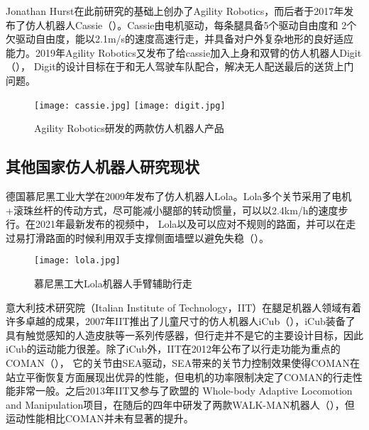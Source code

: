 Jonathan Hurst在此前研究的基础上创办了Agility Robotics，而后者于2017年发布了仿人机器人Cassie\cite{Cassie}（）。Cassie由电机驱动，每条腿具备5个驱动自由度和
2个欠驱动自由度，能以2.1m/s的速度高速行走，并具备对户外复杂地形的良好适应能力。2019年Agility Robotics又发布了给cassie加入上身和双臂的仿人机器人Digit\cite{Digit}（），
Digit的设计目标在于和无人驾驶车队配合，解决无人配送最后的送货上门问题。
\begin{figure}[htbp]
    \centering
        {%
            \texttt{[image: cassie.jpg]}}
    \hspace{1in}            
        {%
            \texttt{[image: digit.jpg]}}
    \caption{Agility Robotics研发的两款仿人机器人产品\label{fig:michigan_biped}}
\end{figure}
\subsection{其他国家仿人机器人研究现状}

德国慕尼黑工业大学在2009年发布了仿人机器人Lola\cite{buschmann2009humanoid}。Lola多个关节采用了电机+滚珠丝杆的传动方式，尽可能减小腿部的转动惯量，可以以2.4km/h的速度步行。在2021年最新发布的视频中，
Lola以及可以应对不规则的路面，并可以在走过易打滑路面的时候利用双手支撑侧面墙壁以避免失稳\cite{Lola}（）。

\begin{figure}[htbp]
    \centering
    \texttt{[image: lola.jpg]}
    \caption{\label{fig:lola}慕尼黑工大Lola机器人手臂辅助行走}
\end{figure}
意大利技术研究院（Italian Institute of Technology，IIT）在腿足机器人领域有着许多卓越的成果，2007年IIT推出了儿童尺寸的仿人机器人iCub\cite{tsagarakis2007icub}（），iCub装备了
具有触觉感知的人造皮肤等一系列传感器，但行走并不是它的主要设计目标，因此iCub的运动能力很差。除了iCub外，IIT在2012年公布了以行走功能为重点的COMAN\cite{dallali2012global}（），
它的关节由SEA驱动，SEA带来的关节力控制效果使得COMAN在站立平衡恢复方面展现出优异的性能，但电机的功率限制决定了COMAN的行走性能非常一般。之后2013年IIT又参与了欧盟的
Whole-body Adaptive Locomotion and Manipulation项目，在随后的四年中研发了两款WALK-MAN机器人\cite{tsagarakis2017walk}（），但运动性能相比COMAN并未有显著的提升。

